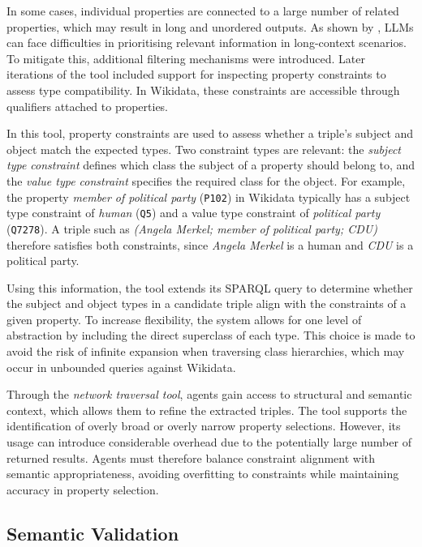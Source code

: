 \documentclass[a4paper,oneside,bibliography=totoc]{scrbook}
\begin{document}
In some cases, individual properties are connected to a large number of related properties, which may result in long and unordered outputs. As shown by \citet{Hsieh2024}, \acp{LLM} can face difficulties in prioritising relevant information in long-context scenarios. To mitigate this, additional filtering mechanisms were introduced. Later iterations of the tool included support for inspecting property constraints to assess type compatibility. In Wikidata, these constraints are accessible through qualifiers attached to properties.

In this tool, property constraints are used to assess whether a triple's subject and object match the expected types. Two constraint types are relevant: the \textit{subject type constraint} defines which class the subject of a property should belong to, and the \textit{value type constraint} specifies the required class for the object. For example, the property \textit{member of political party} (\texttt{P102}) in Wikidata typically has a subject type constraint of \textit{human} (\texttt{Q5}) and a value type constraint of \textit{political party} (\texttt{Q7278}). A triple such as \textit{(Angela Merkel; member of political party; CDU)} therefore satisfies both constraints, since \textit{Angela Merkel} is a human and \textit{CDU} is a political party.

Using this information, the tool extends its \ac{SPARQL} query to determine whether the subject and object types in a candidate triple align with the constraints of a given property. To increase flexibility, the system allows for one level of abstraction by including the direct superclass of each type. This choice is made to avoid the risk of infinite expansion when traversing class hierarchies, which may occur in unbounded queries against Wikidata.

Through the \textit{network traversal tool}, agents gain access to structural and semantic context, which allows them to refine the extracted triples. The tool supports the identification of overly broad or overly narrow property selections. However, its usage can introduce considerable overhead due to the potentially large number of returned results. Agents must therefore balance constraint alignment with semantic appropriateness, avoiding overfitting to constraints while maintaining accuracy in property selection.

\subsection{Semantic Validation}
\label{subsec:semantic_validation}
\end{document}
